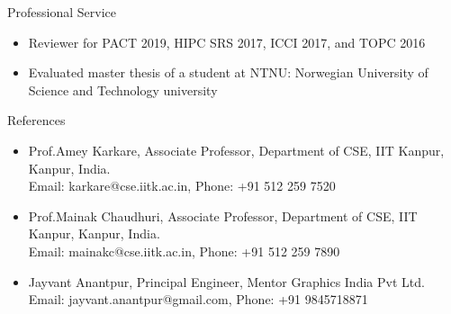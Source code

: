 \documentclass{resume} %
\begin{document}
\begin{rSection}{Professional Service}

\begin{itemize}
\item Reviewer for PACT 2019, HIPC SRS 2017, ICCI 2017, and TOPC 2016
\item Evaluated master thesis of a student at NTNU: Norwegian University of Science and Technology university
\end{itemize}

\end{rSection}




\begin{rSection}{References}

\begin{itemize}
\item Prof.Amey Karkare, Associate Professor, Department of CSE, IIT Kanpur, Kanpur, India. \\ 
Email: karkare@cse.iitk.ac.in, Phone: +91 512 259 7520
\item Prof.Mainak Chaudhuri, Associate Professor, Department of CSE, IIT Kanpur, Kanpur, India. \\ 
Email: mainakc@cse.iitk.ac.in, Phone: +91 512 259 7890
\item Jayvant Anantpur, Principal Engineer, Mentor Graphics India Pvt Ltd. \\
Email: jayvant.anantpur@gmail.com, Phone: +91 9845718871
\end{itemize}

\end{rSection}

\pagebreak
\end{document}
